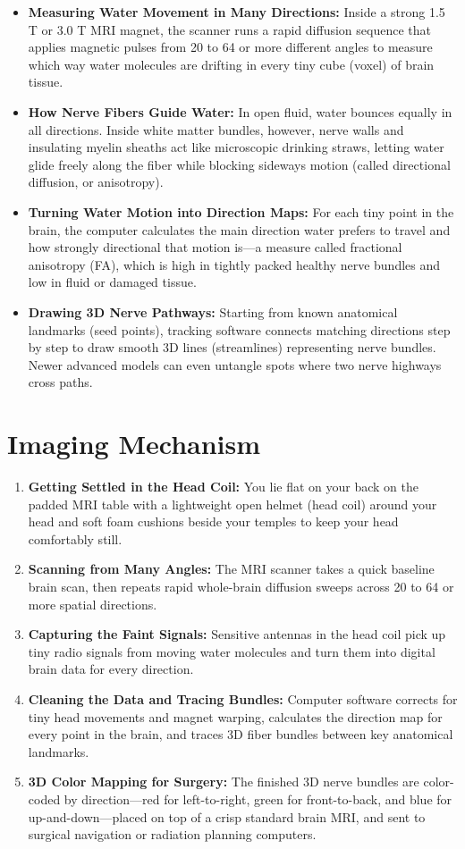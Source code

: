 \begin{itemize}
    \item \textbf{Measuring Water Movement in Many Directions:} Inside a strong 1.5 T or 3.0 T MRI magnet, the scanner runs a rapid diffusion sequence that applies magnetic pulses from 20 to 64 or more different angles to measure which way water molecules are drifting in every tiny cube (voxel) of brain tissue.
    \item \textbf{How Nerve Fibers Guide Water:} In open fluid, water bounces equally in all directions. Inside white matter bundles, however, nerve walls and insulating myelin sheaths act like microscopic drinking straws, letting water glide freely along the fiber while blocking sideways motion (called directional diffusion, or anisotropy).
    \item \textbf{Turning Water Motion into Direction Maps:} For each tiny point in the brain, the computer calculates the main direction water prefers to travel and how strongly directional that motion is---a measure called fractional anisotropy (FA), which is high in tightly packed healthy nerve bundles and low in fluid or damaged tissue.
    \item \textbf{Drawing 3D Nerve Pathways:} Starting from known anatomical landmarks (seed points), tracking software connects matching directions step by step to draw smooth 3D lines (streamlines) representing nerve bundles. Newer advanced models can even untangle spots where two nerve highways cross paths.
\end{itemize}

\section{Imaging Mechanism}

\begin{enumerate}
    \item \textbf{Getting Settled in the Head Coil:} You lie flat on your back on the padded MRI table with a lightweight open helmet (head coil) around your head and soft foam cushions beside your temples to keep your head comfortably still.
    \item \textbf{Scanning from Many Angles:} The MRI scanner takes a quick baseline brain scan, then repeats rapid whole-brain diffusion sweeps across 20 to 64 or more spatial directions.
    \item \textbf{Capturing the Faint Signals:} Sensitive antennas in the head coil pick up tiny radio signals from moving water molecules and turn them into digital brain data for every direction.
    \item \textbf{Cleaning the Data and Tracing Bundles:} Computer software corrects for tiny head movements and magnet warping, calculates the direction map for every point in the brain, and traces 3D fiber bundles between key anatomical landmarks.
    \item \textbf{3D Color Mapping for Surgery:} The finished 3D nerve bundles are color-coded by direction---red for left-to-right, green for front-to-back, and blue for up-and-down---placed on top of a crisp standard brain MRI, and sent to surgical navigation or radiation planning computers.
\end{enumerate}

